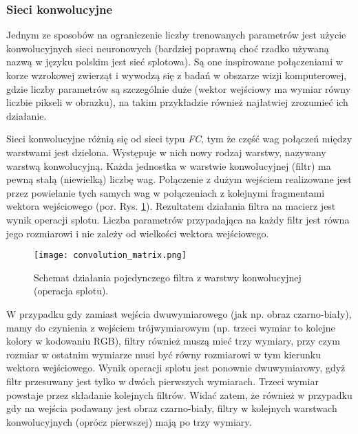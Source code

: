 \subsubsection*{Sieci konwolucyjne}
Jednym ze sposobów na ograniczenie liczby trenowanych parametrów jest użycie konwolucyjnych sieci neuronowych (bardziej poprawną choć rzadko używaną nazwą w języku polskim jest sieć splotowa). Są one inspirowane połączeniami w korze wzrokowej zwierząt i wywodzą się z badań w obszarze wizji komputerowej, gdzie liczby parametrów są szczególnie duże (wektor wejściowy ma wymiar równy liczbie pikseli w obrazku), na takim przykładzie również najłatwiej zrozumieć ich działanie.

Sieci konwolucyjne różnią się od sieci typu \textit{FC}, tym że część wag połączeń między warstwami jest dzielona. Występuje w nich nowy rodzaj warstwy, nazywany warstwą konwolucyjną. Każda jednostka w warstwie konwolucyjnej (filtr) ma pewną stałą (niewielką) liczbę wag. Połączenie z dużym  wejściem realizowane jest przez powielanie tych samych wag w połączeniach z kolejnymi fragmentami wektora wejściowego (por. Rys. \ref{fig:convolution}). Rezultatem działania filtra na macierz jest wynik operacji splotu. Liczba parametrów przypadająca na każdy filtr jest równa jego rozmiarowi i nie zależy od wielkości wektora wejściowego. 

\begin{figure}[h]
	\centering
	\texttt{[image: convolution\_matrix.png]}
	\caption{Schemat działania pojedynczego filtra z warstwy konwolucyjnej (operacja splotu).}
	\label{fig:convolution}
\end{figure}

W przypadku gdy zamiast wejścia dwuwymiarowego (jak np. obraz czarno-biały), mamy do czynienia z wejściem trójwymiarowym (np. trzeci wymiar to kolejne kolory w kodowaniu RGB), filtry również muszą mieć trzy wymiary, przy czym rozmiar w ostatnim wymiarze musi być równy rozmiarowi w tym kierunku wektora wejściowego. Wynik operacji splotu jest ponownie dwuwymiarowy, gdyż filtr przesuwany jest tylko w dwóch pierwszych wymiarach. Trzeci wymiar powstaje przez składanie kolejnych filtrów. Widać zatem, że również w przypadku gdy na wejścia podawany jest obraz czarno-biały, filtry w kolejnych warstwach konwolucyjnych (oprócz pierwszej) mają po trzy wymiary.

